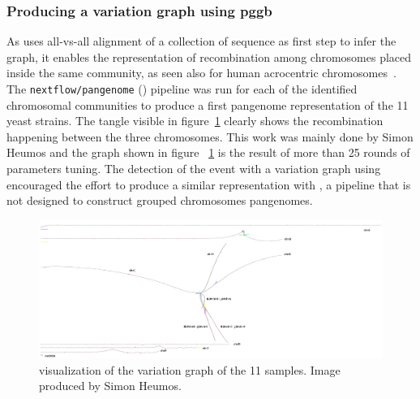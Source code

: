 \subsubsection{Producing a variation graph using pggb}
As \pggb uses all-vs-all alignment of a collection of sequence as first step to infer the graph, it enables the representation of recombination among chromosomes placed inside the same community, as seen also for human acrocentric chromosomes~\cite{Guarracino2023}.\\
The \texttt{nextflow/pangenome} (\pggb) pipeline was run for each of the identified chromosomal communities to produce a first pangenome representation of the 11 yeast strains. The tangle visible in figure~\ref{fig:lodelo_gfaestus} clearly shows the recombination happening between the three chromosomes. This work was mainly done by Simon Heumos and the graph shown in figure ~\ref{fig:lodelo_gfaestus} is the result of more than 25 rounds of parameters tuning.
The detection of the event with a variation graph using \pggb encouraged the effort to produce a similar representation with \mcactus, a pipeline that is not designed to construct grouped chromosomes pangenomes.
\begin{figure}[h!]
	\centering
	\includegraphics[angle=90,width=.4\linewidth]{figures/lodelo/pggb_full.png}
	\caption[\gfaestus visualization of a \lodelo variation graph.]{\gfaestus visualization of the \pggb variation graph of the 11 \lodelo samples. Image produced by Simon Heumos.}
	\label{fig:lodelo_gfaestus}
\end{figure}


